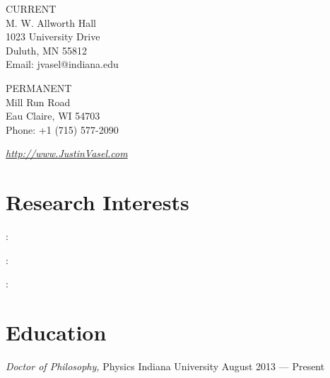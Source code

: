 \documentclass{cv}
\begin{document}
\begin{resume}

\vspace{0.2in}

\begin{multicols}{2}
  \textsf{CURRENT} \\
  {\color{light}  M. W. Allworth Hall \\
  1023 University Drive \\
  Duluth, MN 55812 \\
  Email: jvasel{@}indiana.edu \normalfont} \\ 
  \columnbreak
  
  \textsf{PERMANENT} \\
  {\color{light}  Mill Run Road \\
  Eau Claire, WI 54703 \\
  Phone: +1 (715) 577-2090 \normalfont}
\end{multicols}

\vspace{-0.2in}


\large \emph{\href{http://www.justinvasel.com/}{http://www.JustinVasel.com} } \normalsize



\section{Research Interests}

 : 
\itemSep

 : 
\itemSep

 : 



\section{Education}



\object																		
{\emph{Doctor of Philosophy,} Physics}										
{\rm Indiana University}														
{August 2013 --- Present}



\end{resume}
\end{document}
